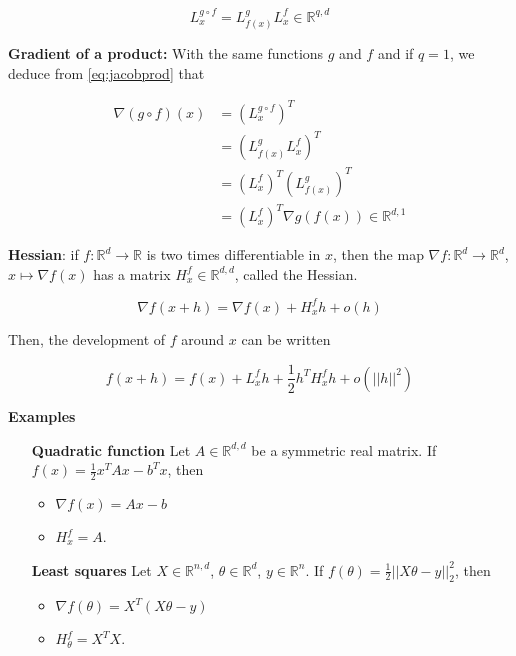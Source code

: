 \documentclass[
10pt, %
a4paper, %
oneside, %
headinclude,footinclude, %
BCOR5mm, %
]{scrartcl}
\begin{document}
\begin{equation}
    \label{eq:jacobprod}
    L^{g\circ f}_x=L^{g}_{f(x)}L^f_x\in \mathbb{R}^{q, d}
\end{equation}


\textbf{{Gradient of a product:}} 
With the same functions $g$ and $f$ and if $q=1$, we deduce from \ref{eq:jacobprod} that 

\begin{equation*}
    \begin{aligned}
	\nabla (g\circ f)(x)&= (L^{g\circ f}_x)^T\\
	&=(L^{g}_{f(x)}L^f_x)^T\\
	&=(L^f_x)^T(L^{g}_{f(x)})^T\\
	&= (L^f_x)^T\nabla g(f(x))\in \mathbb{R}^{d, 1}
    \end{aligned}
\end{equation*}

\textbf{{Hessian}}: if $f: \mathbb{R}^d\rightarrow \mathbb{R} $ is two times differentiable in $x$, then the map $\nabla f: \mathbb{R}^d\rightarrow \mathbb{R}^d$, $x\mapsto\nabla f(x)$ has a matrix $H^f_x\in \mathbb{R}^{d,d}$, called the Hessian.

\begin{equation}
    \nabla f(x+h)=\nabla f(x)+H^f_xh+o(h)
\end{equation}

Then, the development of $f$ around $x$ can be written

\begin{equation}
    f(x+h)=f(x)+L^f_xh+ \frac{1}{2} h^TH^f_xh+o(||h||^2)
\end{equation}

\textbf{{Examples}} 

\begin{itemize}
    \item[ \textbf{{Quadratic function}}] Let $A\in \mathbb{R}^{d,d}$ be a symmetric real matrix. If $f(x)= \frac{1}{2} x^TAx-b^Tx$, then
	\begin{itemize}
	    \item $\nabla f(x)=Ax-b$ 
	    \item $H_x^f=A$.
	\end{itemize}
    \item[ \textbf{{Least squares}} ] Let $X\in \mathbb{R}^{n,d}$, $\theta\in \mathbb{R}^d$, $y\in \mathbb{R}^n$. If $f(\theta)= \frac{1}{2} ||X\theta-y||_2^2$, then
	\begin{itemize}
	    \item $\nabla f(\theta)=X^T(X\theta-y)$
	    \item $H_{\theta}^f=X^TX$.
	\end{itemize}
\end{itemize}
\end{document}
